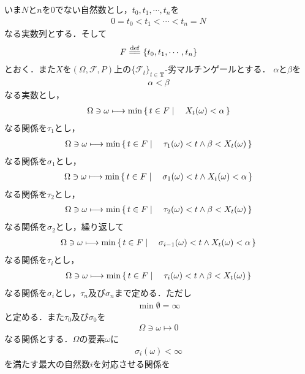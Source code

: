 	いま$N$と$n$を$0$でない自然数とし，$t_0,t_1,\cdots,t_n$を
	\begin{align}
		0 = t_0 < t_1 < \cdots < t_n = N
	\end{align}
	なる実数列とする．そして
	\begin{align}
		F \defeq \{t_0,t_1,\cdots,t_n\}
	\end{align}
	とおく．また$X$を$(\Omega,\mathscr{F},P)$上の$\{\mathscr{F}_t\}_{t \in \mathbf{T}}$-劣マルチンゲールとする．
	$\alpha$と$\beta$を
	\begin{align}
		\alpha < \beta
	\end{align}
	なる実数とし，
	\begin{align}
		\Omega \ni \omega \longmapsto \min{}{\left\{\, t \in F \mid \quad X_t(\omega) < \alpha\, \right\}}
	\end{align}
	なる関係を$\tau_1$とし，
	\begin{align}
		\Omega \ni \omega \longmapsto \min{}{\left\{\, t \in F \mid \quad \tau_1(\omega) < t \wedge \beta < X_t(\omega)\, \right\}}
	\end{align}
	なる関係を$\sigma_1$とし，
	\begin{align}
		\Omega \ni \omega \longmapsto \min{}{\left\{\, t \in F \mid \quad \sigma_1(\omega) < t \wedge X_t(\omega) < \alpha\, \right\}}
	\end{align}
	なる関係を$\tau_2$とし，
	\begin{align}
		\Omega \ni \omega \longmapsto \min{}{\left\{\, t \in F \mid \quad \tau_2(\omega) < t \wedge \beta < X_t(\omega)\, \right\}}
	\end{align}
	なる関係を$\sigma_2$とし，繰り返して
	\begin{align}
		\Omega \ni \omega \longmapsto \min{}{\left\{\, t \in F \mid \quad \sigma_{i-1}(\omega) < t \wedge X_t(\omega) < \alpha\, \right\}}
	\end{align}
	なる関係を$\tau_i$とし，
	\begin{align}
		\Omega \ni \omega \longmapsto \min{}{\left\{\, t \in F \mid \quad \tau_i(\omega) < t \wedge \beta < X_t(\omega)\, \right\}}
	\end{align}
	なる関係を$\sigma_i$とし，$\tau_n$及び$\sigma_n$まで定める．ただし
	\begin{align}
		\min{}{\emptyset} = \infty
	\end{align}
	と定める．また$\tau_0$及び$\sigma_0$を
	\begin{align}
		\Omega \ni \omega \longmapsto 0
	\end{align}
	なる関係とする．$\Omega$の要素$\omega$に
	\begin{align}
		\sigma_i(\omega) < \infty
	\end{align}
	を満たす最大の自然数$i$を対応させる関係を
